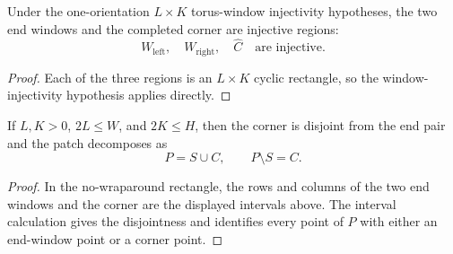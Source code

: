 \begin{lemma}
    \label{lem:peps_horizontal_staircase_window_injectivity}
    \leanok
    Under the one-orientation $L\times K$ torus-window injectivity hypotheses,
    the two end windows and the completed corner are injective regions:
    \[
        W_{\mathrm{left}},\quad W_{\mathrm{right}},\quad \widehat C
        \quad\text{are injective.}
    \]
\end{lemma}
\begin{proof}
    \leanok
    Each of the three regions is an $L\times K$ cyclic rectangle, so the
    window-injectivity hypothesis applies directly.
\end{proof}

\begin{lemma}
    \label{lem:peps_horizontal_staircase_patch_decomposition}
    \leanok
    If $L,K>0$, $2L\le W$, and $2K\le H$, then the corner is disjoint from
    the end pair and the patch decomposes as
    \[
        P=S\cup C,
        \qquad
        P\setminus S=C.
    \]
\end{lemma}
\begin{proof}
    \leanok
    In the no-wraparound rectangle, the rows and columns of the two end
    windows and the corner are the displayed intervals above.  The interval
    calculation gives the disjointness and identifies every point of $P$ with
    either an end-window point or a corner point.
\end{proof}


